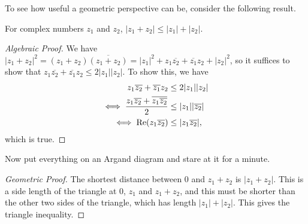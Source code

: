 \documentclass[a4paper]{scrartcl}
\begin{document}
To see how useful a geometric perspective can be, consider the following result.

\begin{proposition}
	For complex numbers $z_1$ and $z_2$, $|z_1 + z_2| \leq |z_1| + |z_2|$.
\end{proposition}
\begin{proof}[Algebraic Proof]
	We have $|z_1 + z_2|^2 = (z_1 + z_2)\overline{(z_1 + z_2)} = |z_1|^2 + z_1 \overline{z_2} + \overline{z_1} z_2 + |z_2|^2$, so it suffices to show that $z_1 \overline{z_2} + \overline{z_1} z_2 \leq 2 |z_1| |z_2|$. To show this, we have
	\begin{align*}
		z_1 \overline{z_2} + \overline{z_1} z_2 &\leq 2 |z_1| |z_2| \\
\iff 	\frac{z_1 \overline{z_2} + \overline{z_1 \overline{z_2}}}{2} &\leq |z_1| |\overline{z_2}| \\
\iff \operatorname{Re}(z_1 \overline{z_2}) &\leq |z_1 \overline{z_2}|,
	\end{align*}
	which is true. 
\end{proof}

Now put everything on an Argand diagram and stare at it for a minute.


\begin{center}
  \end{center}

\begin{proof}[Geometric Proof]
	The shortest distance between $0$ and $z_1 + z_2$ is $|z_1 + z_2|$. This is a side length of the triangle at $0$, $z_1$ and $z_1 + z_2$, and this must be shorter than the other two sides of the triangle, which has length $|z_1| + |z_2|$. This gives the triangle inequality. 
\end{proof}
\end{document}
